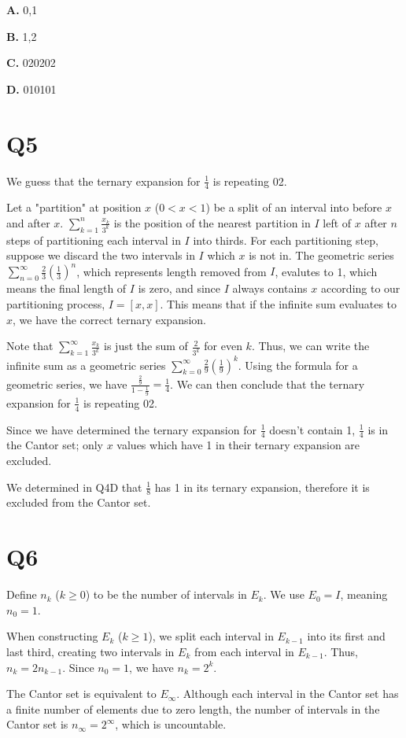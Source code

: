 \documentclass[12pt]{article}
\begin{document}
\begin{outline}
\textbf{A.} 0,1

\textbf{B.} 1,2

\textbf{C.} 020202

\textbf{D.} 010101

\section*{Q5}

We guess that the ternary expansion for $\frac14$ is repeating 02.

Let a "partition" at position $x$ ($0<x<1$) be a split of an interval into before $x$ and after $x$.
$\sum_{k=1}^n \frac{x_k}{3^k}$ is the position of the nearest partition in $I$ left of $x$ after $n$
steps of partitioning each interval in $I$ into thirds. For each partitioning step, suppose
we discard the two intervals in $I$ which $x$ is not in. The geometric series $\sum_{n=0}^{\infty} \frac23\left(\frac13\right)^n$,
which represents length removed from $I$, evalutes to 1, which means the final length of $I$ is zero, and
since $I$ always contains $x$ according to our partitioning process, $I=[x,x]$. This means that if the infinite
sum evaluates to $x$, we have the correct ternary expansion.

Note that $\sum_{k=1}^\infty \frac{x_k}{3^k}$ is just the sum of $\frac2{3^k}$ for even $k$. Thus,
we can write the infinite sum as a geometric series $\sum_{k=0}^\infty \frac29\left(\frac19\right)^k$.
Using the formula for a geometric series, we have $\frac{\frac29}{1-\frac19}=\frac14$.
We can then conclude that the ternary expansion for $\frac14$ is repeating 02.

Since we have determined the ternary expansion for $\frac14$ doesn't contain 1, $\frac14$ is in
the Cantor set; only $x$ values which have 1 in their ternary expansion are excluded.

We determined in Q4D that $\frac18$ has 1 in its ternary expansion, therefore it is excluded from the Cantor
set.

\section*{Q6}

Define $n_k$ ($k\ge 0$) to be the number of intervals in $E_k$. We use $E_0=I$, meaning $n_0=1$.

When constructing $E_k$ ($k\ge 1$), we split each interval in $E_{k-1}$ into its first and last third,
creating two intervals in $E_k$ from each interval in $E_{k-1}$.
Thus, $n_k=2n_{k-1}$. Since $n_0=1$, we have $n_k=2^k$.

The Cantor set is equivalent to $E_{\infty}$. Although each interval in the Cantor set has a finite number
of elements due to zero length, the number of intervals in the Cantor set is $n_{\infty}=2^{\infty}$, which is
uncountable.

\end{outline}
\end{document}
